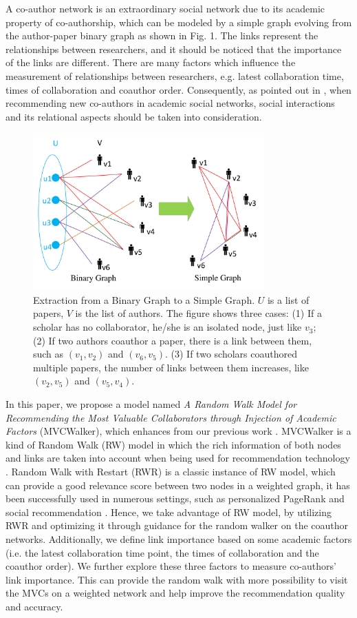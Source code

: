\documentclass[10pt,journal,compsoc]{IEEEtran}
\begin{document}
A co-author network is an extraordinary social network due to its academic property of co-authorship, which can be modeled by a simple graph evolving from the author-paper binary graph as shown in Fig. 1. The links represent the relationships between researchers, and it should be noticed that the importance of the links are different. There are many factors which influence the measurement of relationships between researchers, e.g. latest collaboration time, times of collaboration and coauthor order. Consequently, as pointed out in \cite{Lopes:Colleboration}, when recommending new co-authors in academic social networks, social interactions and its relational aspects should be taken into consideration.
\begin{figure}
\centering
\includegraphics [width=3.5in]{Fig1.pdf}
\caption{Extraction from a Binary Graph to a Simple Graph. $U$ is a list of papers, $V$ is the list of authors. The figure shows three cases: (1) If a scholar has no collaborator, he/she is an isolated node, just like $v_{3}$; (2) If two authors coauthor a paper, there is a link between them, such as $(v_{1}, v_{2})$ and $(v_{6}, v_{5})$. (3) If two scholars coauthored multiple papers, the number of links between them increases, like $(v_{2}, v_{5})$ and $(v_{5}, v_{4})$.}
\end{figure}

In this paper, we propose a model named \emph{A Random Walk Model for Recommending the Most Valuable Collaborators through Injection of Academic Factors} (MVCWalker), which enhances from our previous work \cite{Jing:ACRec}. MVCWalker is a kind of Random Walk (RW) model in which the rich information of both nodes and links are taken into account when being used for recommendation technology \cite{Backstrom:Supervised}. Random Walk with Restart (RWR) is a classic instance of RW model, which can provide a good relevance score between two nodes in a weighted graph, it has been successfully used in numerous settings, such as personalized PageRank and social recommendation \cite{tong2006fast}. Hence, we take advantage of RW model, by utilizing RWR and optimizing it through guidance for the random walker on the coauthor networks. Additionally, we define link importance based on some academic factors (i.e. the latest collaboration time point, the times of collaboration and the coauthor order). We further explore these three factors to measure co-authors' link importance. This can provide the random walk with more possibility to visit the MVCs on a weighted network and help improve the recommendation quality and accuracy.
\end{document}
